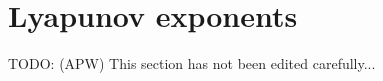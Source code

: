 \documentclass[letterpaper,12pt,preprint]{aastex}
\newcommand{\ident}{\mathbb{1}}
\newcommand{\todo}[2]{{\color{red} TODO: (\MakeUppercase{#1}) #2}}
\begin{document}



\appendix
\section{Lyapunov exponents} \label{sec:lyapapdx}
\todo{apw}{This section has not been edited carefully...}

\end{document}
